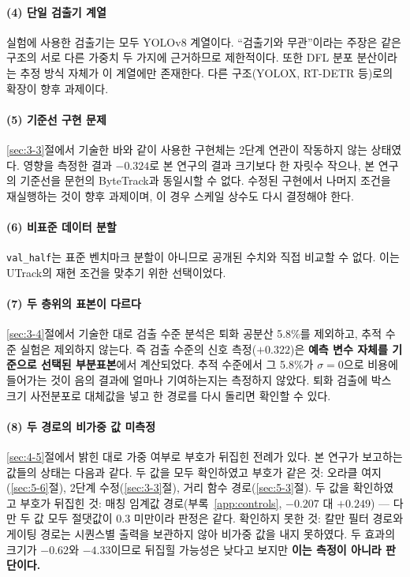 \documentclass[12pt,a4paper,oneside]{report}
\begin{document}
\paragraph{(4) 단일 검출기 계열} 실험에 사용한 검출기는 모두 YOLOv8 계열이다. ``검출기와 무관''이라는 주장은 같은 구조의 서로 다른 가중치 두 가지에 근거하므로 제한적이다. 또한 DFL 분포 분산이라는 추정 방식 자체가 이 계열에만 존재한다. 다른 구조(YOLOX, RT-DETR 등)로의 확장이 향후 과제이다.

\paragraph{(5) 기준선 구현 문제} \ref{sec:3-3}절에서 기술한 바와 같이 사용한 구현체는 2단계 연관이 작동하지 않는 상태였다. 영향을 측정한 결과 $-0.324$로 본 연구의 결과 크기보다 한 자릿수 작으나, 본 연구의 기준선을 문헌의 ByteTrack과 동일시할 수 없다. 수정된 구현에서 나머지 조건을 재실행하는 것이 향후 과제이며, 이 경우 스케일 상수도 다시 결정해야 한다.

\paragraph{(6) 비표준 데이터 분할} \texttt{val\_half}는 표준 벤치마크 분할이 아니므로 공개된 수치와 직접 비교할 수 없다. 이는 UTrack의 재현 조건을 맞추기 위한 선택이었다.

\paragraph{(7) 두 층위의 표본이 다르다} \ref{sec:3-4}절에서 기술한 대로 검출 수준 분석은 퇴화 공분산 5.8\%를 제외하고, 추적 수준 실험은 제외하지 않는다. 즉 검출 수준의 신호 측정($+0.322$)은 \textbf{예측 변수 자체를 기준으로 선택된 부분표본}에서 계산되었다. 추적 수준에서 그 5.8\%가 $\sigma = 0$으로 비용에 들어가는 것이 음의 결과에 얼마나 기여하는지는 측정하지 않았다. 퇴화 검출에 박스 크기 사전분포로 대체값을 넣고 한 경로를 다시 돌리면 확인할 수 있다.

\paragraph{(8) 두 경로의 비가중 값 미측정} \ref{sec:4-5}절에서 밝힌 대로 가중 여부로 부호가 뒤집힌 전례가 있다. 본 연구가 보고하는 값들의 상태는 다음과 같다. 두 값을 모두 확인하였고 부호가 같은 것: 오라클 여지(\ref{sec:5-6}절), 2단계 수정(\ref{sec:3-3}절), 거리 함수 경로(\ref{sec:5-3}절). 두 값을 확인하였고 부호가 뒤집힌 것: 매칭 임계값 경로(부록~\ref{app:controls}, $-0.207$ 대 $+0.249$) --- 다만 두 값 모두 절댓값이 $0.3$ 미만이라 판정은 같다. 확인하지 못한 것: 칼만 필터 경로와 게이팅 경로는 시퀀스별 출력을 보관하지 않아 비가중 값을 내지 못하였다. 두 효과의 크기가 $-0.62$와 $-4.33$이므로 뒤집힐 가능성은 낮다고 보지만 \textbf{이는 측정이 아니라 판단이다.}
\end{document}
